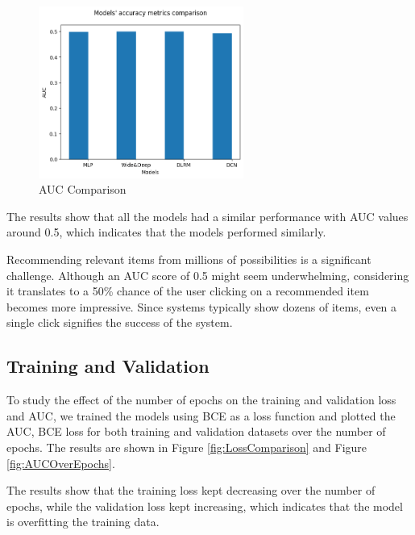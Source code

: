 \begin{figure}[H]
    \centering
    \includegraphics[width=0.6\textwidth]{assets/models_comparasion.png}
    \caption[AUC Comparison]{AUC Comparison}
    \label{fig:AUCComparison}
\end{figure}

The results show that all the models had a similar performance with AUC values around 0.5, which indicates that the models performed similarly.

Recommending relevant items from millions of possibilities is a significant challenge. 
Although an AUC score of 0.5 might seem underwhelming, 
considering it translates to a 50\% chance of the user clicking on a recommended item becomes more impressive. 
Since systems typically show dozens of items, even a single click signifies the success of the system.

\subsection{Training and Validation}

To study the effect of the number of epochs on the training and validation loss and AUC, we trained the models using BCE as a loss function and plotted the AUC, BCE loss for both training and validation datasets over the number of epochs.
The results are shown in Figure \ref{fig:LossComparison} and Figure \ref{fig:AUCOverEpochs}.

The results show that the training loss kept decreasing over the number of epochs, while the validation loss kept increasing, which indicates that the model is overfitting the training data.


